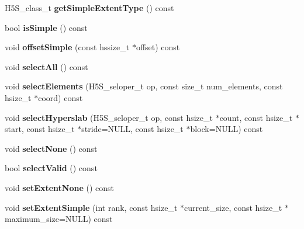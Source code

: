 \begin{DoxyCompactItemize}
\mbox{\label{class_h5_1_1_data_space_ae6309c628a87887e1df4c0655a651436}} 
H5\+S\+\_\+class\+\_\+t {\bfseries get\+Simple\+Extent\+Type} () const
\item 
\mbox{\label{class_h5_1_1_data_space_a5c61542b05501795edd38720783ec689}} 
bool {\bfseries is\+Simple} () const
\item 
\mbox{\label{class_h5_1_1_data_space_a44d006469b3939a3b573d90a2df783ea}} 
void {\bfseries offset\+Simple} (const hssize\+\_\+t $\ast$offset) const
\item 
\mbox{\label{class_h5_1_1_data_space_abe4eb70c76aaed5b35e10aa487f6293a}} 
void {\bfseries select\+All} () const
\item 
\mbox{\label{class_h5_1_1_data_space_a4f0c94427e21244f01b56a2bb51c632d}} 
void {\bfseries select\+Elements} (H5\+S\+\_\+seloper\+\_\+t op, const size\+\_\+t num\+\_\+elements, const hsize\+\_\+t $\ast$coord) const
\item 
\mbox{\label{class_h5_1_1_data_space_a65cdbebc5d97c88140a16030b0f9d6d2}} 
void {\bfseries select\+Hyperslab} (H5\+S\+\_\+seloper\+\_\+t op, const hsize\+\_\+t $\ast$count, const hsize\+\_\+t $\ast$start, const hsize\+\_\+t $\ast$stride=N\+U\+LL, const hsize\+\_\+t $\ast$block=N\+U\+LL) const
\item 
\mbox{\label{class_h5_1_1_data_space_a0313175c25ee2b71a59c1939642ce147}} 
void {\bfseries select\+None} () const
\item 
\mbox{\label{class_h5_1_1_data_space_a5b220f3dd3250e399db8b56560c6af64}} 
bool {\bfseries select\+Valid} () const
\item 
\mbox{\label{class_h5_1_1_data_space_a0608208be8e3fdf368222c832c583aaa}} 
void {\bfseries set\+Extent\+None} () const
\item 
\mbox{\label{class_h5_1_1_data_space_af2dc5b33c4718e4ee4c117aa1e6fb397}} 
void {\bfseries set\+Extent\+Simple} (int rank, const hsize\+\_\+t $\ast$current\+\_\+size, const hsize\+\_\+t $\ast$maximum\+\_\+size=N\+U\+LL) const

\end{DoxyCompactItemize}
